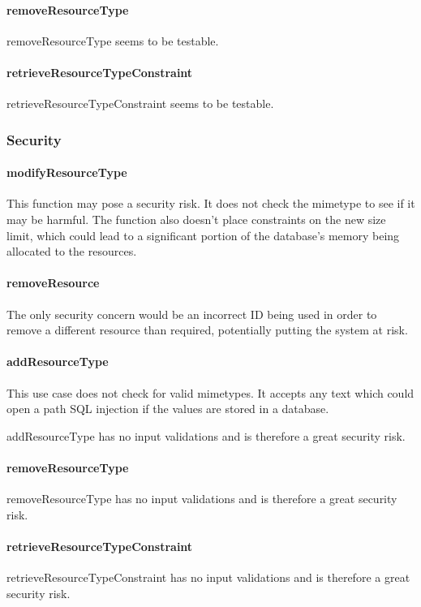 \documentclass[a4paper]{article}
\begin{document}
\paragraph{removeResourceType}
removeResourceType seems to be testable.

\paragraph{retrieveResourceTypeConstraint}
retrieveResourceTypeConstraint seems to be testable.

\subsubsection {Security}

\paragraph{modifyResourceType}
This function may pose a security risk. It does not check the mimetype to see if it may be harmful. The function also doesn’t place constraints on the new size limit, which could lead to a significant portion of the database’s memory being allocated to the resources.

\paragraph{removeResource}
The only security concern would be an incorrect ID being used in order to remove a different resource than required, potentially putting the system at risk.

\paragraph{addResourceType}

 This use case does not check for valid mimetypes. 
 It accepts any text which could open a path SQL injection if the values are stored in a database.  

addResourceType has no input validations and is therefore a great security risk.

\paragraph{removeResourceType}
removeResourceType has no input validations and is therefore a great security risk.

\paragraph{retrieveResourceTypeConstraint}
retrieveResourceTypeConstraint has no input validations and is therefore a great security risk.
\end{document}

